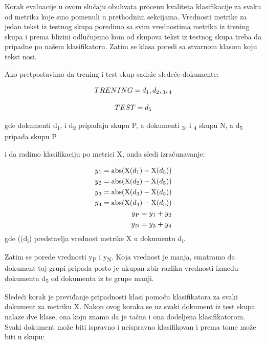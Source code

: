 \documentclass[12pt,oneside]{memoir}
\begin{document}
Korak evaluacije u ovom slučaju obuhvata procenu kvaliteta klasifikacije za svaku od metrika koje smo pomenuli u prethodnim sekcijama.  Vrednosti metrike za jedan tekst iz testnog skupa poredimo sa svim vrednostima metrika iz trening skupa i prema blizini odlučujemo kom od skupova tekst iz testnog skupa treba da pripadne po našem klasifikatoru. Zatim se klasa poredi sa stvarnom klasom koju tekst nosi. 

Ako pretpostavimo da trening i test skup sadrže sledeće dokumente:

\begin{equation}
	TRENING = {d\textsubscript{1}, d\textsubscript{2}, \textsubscript{3}, \textsubscript{4}}
\end{equation}

\begin{equation}
	TEST = {d\textsubscript{5}}
\end{equation}

gde dokumenti d\textsubscript{1}, i d\textsubscript{2} pripadaju skupu P,  a dokumenti \textsubscript{3}, i \textsubscript{4} skupu N, a d\textsubscript{5} pripada skupu P

i da radimo klasifikaciju po metrici X, onda sledi izračunavanje:

\begin{align}
	y\textsubscript{1} = \text{abs}(\text{X}(d\textsubscript{1}) - \text{X}(d\textsubscript{5})) \\
	y\textsubscript{2} = \text{abs}(\text{X}(d\textsubscript{2}) - \text{X}(d\textsubscript{5})) \\
	y\textsubscript{3} = \text{abs}(\text{X}(d\textsubscript{3}) - \text{X}(d\textsubscript{5})) \\
	y\textsubscript{4} = \text{abs}(\text{X}(d\textsubscript{4}) - \text{X}(d\textsubscript{5})) \\
	y\textsubscript{P} = y\textsubscript{1} + y\textsubscript{2} \\
	y\textsubscript{N} = y\textsubscript{3} + y\textsubscript{4}
\end{align}
gde ((d\textsubscript{i}) predstavlja vrednost metrike X u dokumentu d\textsubscript{i}.

Zatim se porede vrednosti y\textsubscript{P} i y\textsubscript{N}.  Koja vrednost je manja,  smatramo da dokument toj grupi pripada posto je ukupan zbir razlika vrednosti između dokumenta {d\textsubscript{5}} od dokumenta iz te grupe manji.  

Sledeći korak je previđanje pripadnosti klasi pomoću klasifikatora za svaki dokument za metriku X.  Nakon ovog koraka se uz svaki dokument iz test skupa nalaze dve klase,  ona koju znamo da je tačna i ona dodeljena klasifikatorom.  Svaki dokument može biti ispravno i neispravno klasifikovan i prema tome može biti u skupu:
\end{document}
